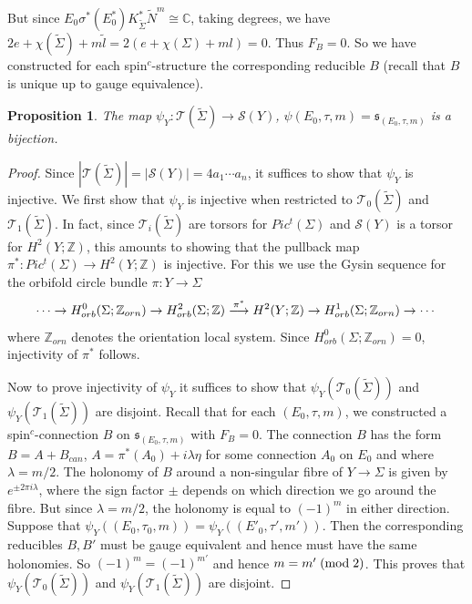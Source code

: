 \documentclass{amsart}
\newtheorem{proposition}[theorem]{Proposition}
\theoremstyle{definition}
\theoremstyle{remark}
\numberwithin{equation}{section}
\begin{document}
But since $E_0 \sigma^*(E_0^*) K_{\widetilde{\Sigma}}^* \widetilde{N}^m \cong \mathbb{C}$, taking degrees, we have $2e + \chi(\widetilde{\Sigma}) + m\widetilde{l} = 2(e + \chi(\Sigma) + ml) = 0$. Thus $F_B = 0$. So we have constructed for each spin$^c$-structure the corresponding reducible $B$ (recall that $B$ is unique up to gauge equivalence).

\begin{proposition}\label{prop:psiY}
The map $\psi_Y \colon \mathcal{T}(\widetilde{\Sigma}) \to \mathcal{S}(Y)$, $\psi(E_0 , \tau , m) = \mathfrak{s}_{(E_0 , \tau , m)}$ is a bijection.
\end{proposition}
\begin{proof}
Since $|\mathcal{T}(\widetilde{\Sigma})| = |\mathcal{S}(Y)| = 4a_1 \cdots a_n$, it suffices to show that $\psi_Y$ is injective. We first show that $\psi_Y$ is injective when restricted to $\mathcal{T}_0(\widetilde{\Sigma})$ and $\mathcal{T}_1(\widetilde{\Sigma})$. In fact, since $\mathcal{T}_i(\widetilde{\Sigma})$ are torsors for $Pic^t(\Sigma)$ and $\mathcal{S}(Y)$ is a torsor for $H^2(Y ; \mathbb{Z})$, this amounts to showing that the pullback map $\pi^* \colon Pic^t(\Sigma) \to H^2(Y ; \mathbb{Z})$ is injective. For this we use the Gysin sequence for the orbifold circle bundle $\pi : Y \to \Sigma$
\[
\cdots \to H^0_{orb}(\Sigma ; \mathbb{Z}_{orn} ) \to H^2_{orb}(\Sigma ; \mathbb{Z}) \buildrel \pi^* \over \longrightarrow H^2(Y ; \mathbb{Z}) \to H^1_{orb}(\Sigma ; \mathbb{Z}_{orn}) \to \cdots
\]
where $\mathbb{Z}_{orn}$ denotes the orientation local system. Since $H^0_{orb}(\Sigma ; \mathbb{Z}_{orn}) = 0$, injectivity of $\pi^*$ follows.

Now to prove injectivity of $\psi_Y$ it suffices to show that $\psi_Y( \mathcal{T}_0(\widetilde{\Sigma}))$ and $\psi_Y(\mathcal{T}_1(\widetilde{\Sigma}))$ are disjoint. Recall that for each $(E_0 , \tau , m)$, we constructed a spin$^c$-connection $B$ on $\mathfrak{s}_{(E_0 , \tau , m)}$ with $F_B = 0$. The connection $B$ has the form $B = A + B_{can}$, $A = \pi^*(A_0) + i\lambda \eta$ for some connection $A_0$ on $E_0$ and where $\lambda = m/2$. The holonomy of $B$ around a non-singular fibre of $Y \to \Sigma$ is given by $e^{ \pm 2\pi i \lambda}$, where the sign factor $\pm $ depends on which direction we go around the fibre. But since $\lambda = m/2$, the holonomy is equal to $(-1)^m$ in either direction. Suppose that $\psi_Y( (E_0 , \tau_0 , m) ) = \psi_Y( (E'_0 , \tau' , m'))$. Then the corresponding reducibles $B,B'$ must be gauge equivalent and hence must have the same holonomies. So $(-1)^m = (-1)^{m'}$ and hence $m = m' \; ({\rm mod} \; 2)$. This proves that $\psi_Y( \mathcal{T}_0(\widetilde{\Sigma}))$ and $\psi_Y(\mathcal{T}_1(\widetilde{\Sigma}))$ are disjoint.
 
\end{proof}
\end{document}
